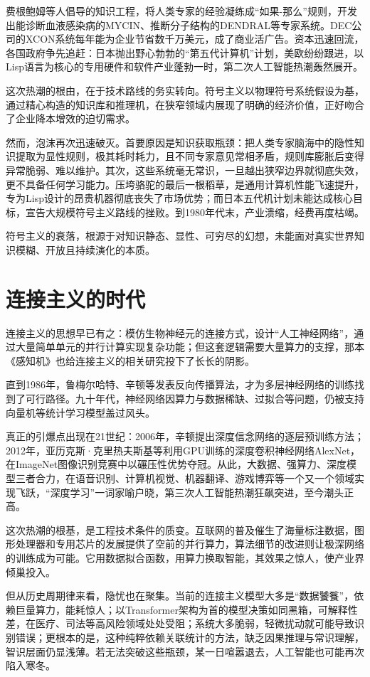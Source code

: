 费根鲍姆等人倡导的知识工程，将人类专家的经验凝练成“如果-那么”规则，开发出能诊断血液感染病的MYCIN、推断分子结构的DENDRAL等专家系统。DEC公司的XCON系统每年能为企业节省数千万美元，成了商业活广告。资本迅速回流，各国政府争先追赶：日本抛出野心勃勃的“第五代计算机”计划，美欧纷纷跟进，以Lisp语言为核心的专用硬件和软件产业蓬勃一时，第二次人工智能热潮轰然展开。

这次热潮的根由，在于技术路线的务实转向。符号主义以物理符号系统假设为基，通过精心构造的知识库和推理机，在狭窄领域内展现了明确的经济价值，正好吻合了企业降本增效的迫切需求。

然而，泡沫再次迅速破灭。首要原因是知识获取瓶颈：把人类专家脑海中的隐性知识提取为显性规则，极其耗时耗力，且不同专家意见常相矛盾，规则库膨胀后变得异常脆弱、难以维护。其次，这些系统毫无常识，一旦越出狭窄边界就彻底失效，更不具备任何学习能力。压垮骆驼的最后一根稻草，是通用计算机性能飞速提升，专为Lisp设计的昂贵机器彻底丧失了市场优势；而日本五代机计划未能达成核心目标，宣告大规模符号主义路线的挫败。到1980年代末，产业溃缩，经费再度枯竭。

符号主义的衰落，根源于对知识静态、显性、可穷尽的幻想，未能面对真实世界知识模糊、开放且持续演化的本质。

\section{连接主义的时代}

连接主义的思想早已有之：模仿生物神经元的连接方式，设计“人工神经网络”，通过大量简单单元的并行计算实现复杂功能；但这套逻辑需要大量算力的支撑，那本《感知机》也给连接主义的相关研究投下了长长的阴影。

直到1986年，鲁梅尔哈特、辛顿等发表反向传播算法，才为多层神经网络的训练找到了可行路径。九十年代，神经网络因算力与数据稀缺、过拟合等问题，仍被支持向量机等统计学习模型盖过风头。

真正的引爆点出现在21世纪：2006年，辛顿提出深度信念网络的逐层预训练方法；2012年，亚历克斯·克里热夫斯基等利用GPU训练的深度卷积神经网络AlexNet，在ImageNet图像识别竞赛中以碾压性优势夺冠。从此，大数据、强算力、深度模型三者合力，在语音识别、计算机视觉、机器翻译、游戏博弈等一个又一个领域实现飞跃，“深度学习”一词家喻户晓，第三次人工智能热潮狂飙突进，至今潮头正高。

这次热潮的根基，是工程技术条件的质变。互联网的普及催生了海量标注数据，图形处理器和专用芯片的发展提供了空前的并行算力，算法细节的改进则让极深网络的训练成为可能。它用数据拟合函数，用算力换取智能，其效果之惊人，使产业界倾巢投入。

但从历史周期律来看，隐忧也在聚集。当前的连接主义模型大多是“数据饕餮”，依赖巨量算力，能耗惊人；以Transformer架构为首的模型决策如同黑箱，可解释性差，在医疗、司法等高风险领域处处受阻；系统大多脆弱，轻微扰动就可能导致识别错误；更根本的是，这种纯粹依赖关联统计的方法，缺乏因果推理与常识理解，智识层面仍显浅薄。若无法突破这些瓶颈，某一日喧嚣退去，人工智能也可能再次陷入寒冬。

